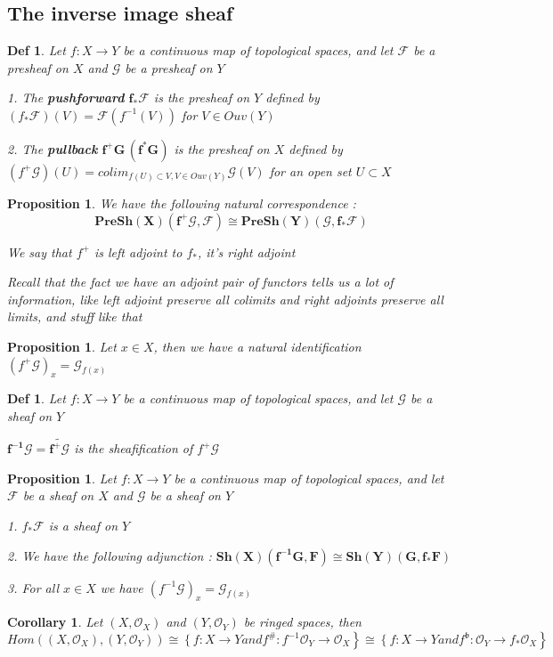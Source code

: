 \documentclass{article}
\newtheorem{definition}[theorem]{Def}
\newtheorem{corollary}[theorem]{Corollary}
\newtheorem{proposition}[theorem]{Proposition}
\begin{document}
\subsection{The inverse image sheaf}
\begin{definition}
Let $f : X \rightarrow Y$ be a continuous map of topological spaces, and let $\mathcal F$ be a presheaf
on $X$ and $\mathcal G$ be a presheaf on $Y$

1. The \textbf{pushforward} $\bm{f_\ast\mathcal F}$ is the presheaf on $Y$ defined by $(f_\ast\mathcal F)(V ) =\mathcal F(f^{-1}(V))$ for $V \in Ouv(Y )$

2. The \textbf{pullback} $\bm{f^+ G\,(f^\ast G)}$ is the presheaf on $X$ defined by
$(f^+\mathcal G)(U) = colim _{f(U)\subset V,V \in Ouv(Y)} \mathcal G(V)$
for an open set $U \subset X$
\end{definition}
\begin{proposition}
    We have the following natural correspondence :
$$
\bm{PreSh(X)(f^+\mathcal G,\mathcal F) \cong PreSh(Y)(\mathcal G,f_\ast \mathcal F)}
$$

We say that $f^+$ is left adjoint to $f_\ast$, it’s right adjoint

Recall that the fact we have an adjoint pair of functors tells us a lot of information, like left adjoint
preserve all colimits and right adjoints preserve all limits, and stuff like that
\end{proposition}
\begin{proposition}
    Let $x \in X$, then we have a natural identification $(f^+\mathcal G)_x =\mathcal G_{f(x)}$
\end{proposition}
\begin{definition}
    Let $f : X \rightarrow Y$ be a continuous map of topological spaces, and let $\mathcal G$ be a sheaf on $Y$

    $\bm{f^{-1}\mathcal G=\widetilde{f^+\mathcal G}}$ is the sheafification of $f^+\mathcal G$
\end{definition}
\begin{proposition}
    Let $f : X \rightarrow Y$ be a continuous map of topological spaces, and let $\mathcal F$ be a sheaf on $X$ and $\mathcal G$ be a sheaf on $Y$
    
    1. $f_\ast\mathcal F$ is a sheaf on $Y$

    2. We have the following adjunction : 
    $\bm{Sh(X)(f^{-1}G, F) \cong Sh(Y)(G, f_\ast F)}$

    3. For all $x \in X$ we have $(f^{-1}\mathcal G)_x =\mathcal G_{f(x)}$
    \label{prop 2.26}
\end{proposition}
\begin{corollary}
Let  $\left(X, \mathcal{O}_{X}\right)$  and  $\left(Y, \mathcal{O}_{Y}\right)$  be ringed spaces, then
$$
Hom\left(\left(X, \mathcal{O}_{X}\right),\left(Y, \mathcal{O}_{Y}\right)\right) \cong\left\{f: X \rightarrow Y\right.  and  \left.f^{\#}: f^{-1} \mathcal{O}_{Y} \rightarrow \mathcal{O}_{X}\right\} \cong\left\{f: X \rightarrow Y\right.  and  \left.f^{\mathfrak b}: \mathcal{O}_{Y} \rightarrow f_{*} \mathcal{O}_{X}\right\} 
$$
\end{corollary}
\end{document}
